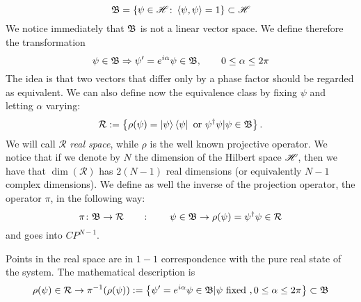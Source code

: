 \begin{equation}
\mathfrak{B}=\left\{\psi\in\mathscr{H}\colon \Braket{\psi,\psi}=1\right\}\subset\mathscr{H}
\end{equation}
We notice immediately that $ \mathfrak{B} $ is not a linear vector space. We define therefore the transformation
\begin{equation}
\psi\in\mathfrak{B}\Rightarrow \psi'=e^{i\alpha}\psi\in\mathfrak{B},\qquad 0\leq\alpha\leq 2\pi
\end{equation}
The idea is that two vectors that differ only by a phase factor should be regarded as equivalent. We can also define now the equivalence class by fixing $ \psi $ and letting $ \alpha $ varying:
\begin{equation}
\mathcal{R}:=\left\{\rho(\psi)=\Ket{\psi}\Bra{\psi} \text{ or } \psi^{\dagger}\psi | \psi\in\mathfrak{B} \right\}.
\end{equation}
We will call $ \mathcal{R} $ \textit{real space}, while $ \rho $ is the well known projective operator. We notice that if we denote by $ N $ the dimension of the Hilbert space $ \mathscr{H} $, then we have that $ \dim(\mathcal{R}) $ has $ 2(N-1) $ real dimensions (or equivalently $ N-1 $ complex dimensions).
We define as well the inverse of the projection operator, the operator $ \pi $, in the following way:
\begin{equation}
\pi\colon \mathfrak{B}\to\mathcal{R} \qquad \colon \qquad \psi\in\mathfrak{B}\rightarrow \rho(\psi)=\psi^{\dagger}\psi\in\mathcal{R}
\end{equation}
and goes into $ CP^{N-1} $.

Points in the real space are in $ 1-1 $ correspondence with the pure real state of the system. The mathematical description is
\begin{equation}
\rho(\psi)\in\mathcal{R}\to\pi^{-1}(\rho(\psi)):=\left\{\psi'=e^{i\alpha}\psi\in\mathfrak{B}|\psi \text{ fixed }, 0\leq\alpha\leq 2\pi \right\}\subset \mathfrak{B}
\end{equation}

